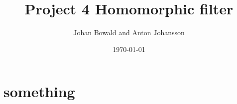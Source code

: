 \documentclass[a4paper]{article}
\title{Project 4 Homomorphic filter}
\author{Johan Bowald and Anton Johansson}
\date{\today}
\begin{document}
\maketitle

\section{something}
\end{document}
